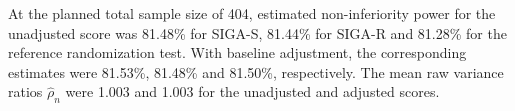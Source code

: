 At the planned total sample size of 404, estimated non-inferiority power for the unadjusted score was 81.48\% for SIGA-S, 81.44\% for SIGA-R and 81.28\% for the reference randomization test. With baseline adjustment, the corresponding estimates were 81.53\%, 81.48\% and 81.50\%, respectively. The mean raw variance ratios $\widehat\rho_n$ were 1.003 and 1.003 for the unadjusted and adjusted scores.
